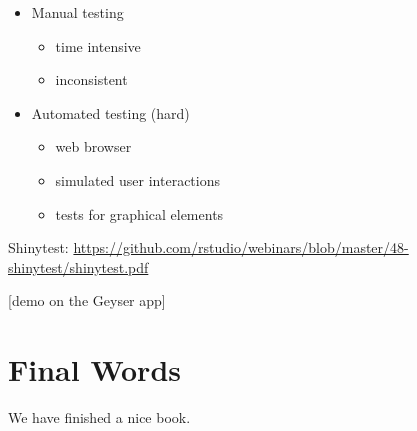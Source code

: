 \documentclass[]{book}
\providecommand{\tightlist}{%
  \setlength{\itemsep}{0pt}\setlength{\parskip}{0pt}}
\begin{document}
\begin{itemize}
\tightlist
\item
  Manual testing

  \begin{itemize}
  \tightlist
  \item
    time intensive
  \item
    inconsistent
  \end{itemize}
\item
  Automated testing (hard)

  \begin{itemize}
  \tightlist
  \item
    web browser
  \item
    simulated user interactions
  \item
    tests for graphical elements
  \end{itemize}
\end{itemize}

Shinytest:
\url{https://github.com/rstudio/webinars/blob/master/48-shinytest/shinytest.pdf}

{[}demo on the Geyser app{]}

\hypertarget{final-words}{%
\chapter{Final Words}\label{final-words}}

We have finished a nice book.
\end{document}
